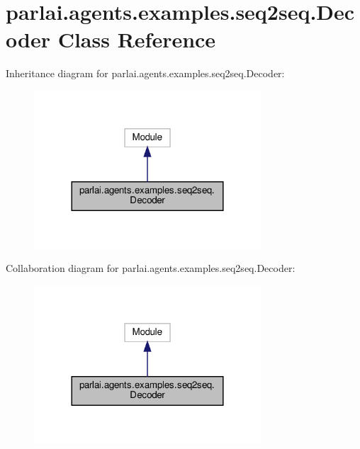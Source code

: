 \hypertarget{classparlai_1_1agents_1_1examples_1_1seq2seq_1_1Decoder}{}\section{parlai.\+agents.\+examples.\+seq2seq.\+Decoder Class Reference}
\label{classparlai_1_1agents_1_1examples_1_1seq2seq_1_1Decoder}


Inheritance diagram for parlai.\+agents.\+examples.\+seq2seq.\+Decoder\+:
\nopagebreak
\begin{figure}[H]
\begin{center}
\leavevmode
\includegraphics[width=240pt]{d5/d76/classparlai_1_1agents_1_1examples_1_1seq2seq_1_1Decoder__inherit__graph}
\end{center}
\end{figure}


Collaboration diagram for parlai.\+agents.\+examples.\+seq2seq.\+Decoder\+:
\nopagebreak
\begin{figure}[H]
\begin{center}
\leavevmode
\includegraphics[width=240pt]{d3/d43/classparlai_1_1agents_1_1examples_1_1seq2seq_1_1Decoder__coll__graph}
\end{center}
\end{figure}
